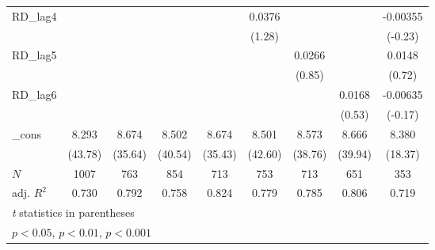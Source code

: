 {\begin{tabular}{l*{8}{c}}
RD\_lag4     &                     &                     &                     &                     &      0.0376         &                     &                     &    -0.00355         \\
            &                     &                     &                     &                     &      (1.28)         &                     &                     &     (-0.23)         \\
\addlinespace
RD\_lag5     &                     &                     &                     &                     &                     &      0.0266         &                     &      0.0148         \\
            &                     &                     &                     &                     &                     &      (0.85)         &                     &      (0.72)         \\
\addlinespace
RD\_lag6     &                     &                     &                     &                     &                     &                     &      0.0168         &    -0.00635         \\
            &                     &                     &                     &                     &                     &                     &      (0.53)         &     (-0.17)         \\
\addlinespace
\_cons      &       8.293\sym{***}&       8.674\sym{***}&       8.502\sym{***}&       8.674\sym{***}&       8.501\sym{***}&       8.573\sym{***}&       8.666\sym{***}&       8.380\sym{***}\\
            &     (43.78)         &     (35.64)         &     (40.54)         &     (35.43)         &     (42.60)         &     (38.76)         &     (39.94)         &     (18.37)         \\
\midrule
\(N\)       &        1007         &         763         &         854         &         713         &         753         &         713         &         651         &         353         \\
adj. \(R^{2}\)&       0.730         &       0.792         &       0.758         &       0.824         &       0.779         &       0.785         &       0.806         &       0.719         \\
\bottomrule
\multicolumn{9}{l}{\footnotesize \textit{t} statistics in parentheses}\\
\multicolumn{9}{l}{\footnotesize \sym{*} \(p<0.05\), \sym{**} \(p<0.01\), \sym{***} \(p<0.001\)}\\
\end{tabular}
}
